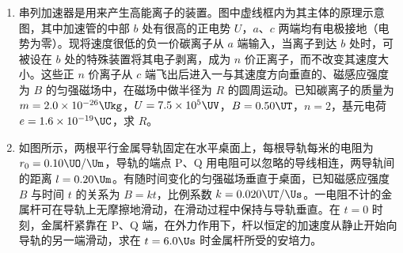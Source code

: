 \documentclass[\gkver]{gaokaozhenti}
\begin{document}
\begin{enumerate}
\item
串列加速器是用来产生高能离子的装置。图中虚线框内为其主体的原理示意图，其中加速管的中部 $b$ 处有很高的正电势 $U$，$a$、$c$ 两端均有电极接地（电势为零）。现将速度很低的负一价碳离子从 $a$ 端输入，当离子到达 $b$ 处时，可被设在 $b$ 处的特殊装置将其电子剥离，成为 $n$ 价正离子，而不改变其速度大小。这些正 $n$ 价离子从 $c$ 端飞出后进入一与其速度方向垂直的、磁感应强度为 $B$ 的匀强磁场中，在磁场中做半径为 $R$ 的圆周运动。已知碳离子的质量为 $m=2.0\times10^{-26}\Ukg$，$U=7.5\times10^{5}\UV$，$B=0.50\UT$，$n=2$，基元电荷 $e=1.6\times10^{-19}\UC$，求 $R$。

\item
如图所示，两根平行金属导轨固定在水平桌面上，每根导轨每米的电阻为 $r_{0}=0.10\UO/\Um$，导轨的端点 P、Q 用电阻可以忽略的导线相连，两导轨间的距离 $l=0.20\Um$。有随时间变化的匀强磁场垂直于桌面，已知磁感应强度 $B$ 与时间 $t$ 的关系为 $B=kt$，比例系数 $k=0.020\UT/\Us$。一电阻不计的金属杆可在导轨上无摩擦地滑动，在滑动过程中保持与导轨垂直。在 $t=0$ 时刻，金属杆紧靠在 P、Q 端，在外力作用下，杆以恒定的加速度从静止开始向导轨的另一端滑动，求在 $t=6.0\Us$ 时金属杆所受的安培力。


\end{enumerate}
\end{document}
